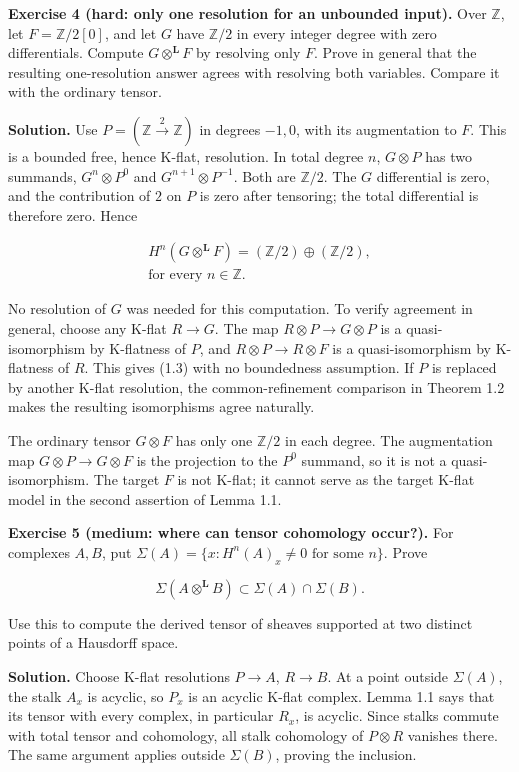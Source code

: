 \documentclass[
  english,
  11pt,
  a4paper,
]{article}
\begin{document}
\textbf{Exercise 4 (hard: only one resolution for an unbounded input).}
Over \(\mathbb Z\), let \(F=\mathbb Z/2[0]\), and let \(G\) have
\(\mathbb Z/2\) in every integer degree with zero differentials. Compute
\(G\otimes^{\mathbf L}F\) by resolving only \(F\). Prove in general that
the resulting one-resolution answer agrees with resolving both
variables. Compare it with the ordinary tensor.

\textbf{Solution.} Use \(P=(\mathbb Z\xrightarrow{2}\mathbb Z)\) in
degrees \(-1,0\), with its augmentation to \(F\). This is a bounded
free, hence K-flat, resolution. In total degree \(n\), \(G\otimes P\)
has two summands, \(G^n\otimes P^0\) and \(G^{n+1}\otimes P^{-1}\). Both
are \(\mathbb Z/2\). The \(G\) differential is zero, and the
contribution of \(2\) on \(P\) is zero after tensoring; the total
differential is therefore zero. Hence

\[\begin{gathered}
H^n(G\otimes^{\mathbf L}F)
=(\mathbb Z/2)\oplus(\mathbb Z/2),\\
\text{for every }n\in\mathbb Z.
\end{gathered}\]

No resolution of \(G\) was needed for this computation. To verify
agreement in general, choose any K-flat \(R\to G\). The map
\(R\otimes P\to G\otimes P\) is a quasi-isomorphism by K-flatness of
\(P\), and \(R\otimes P\to R\otimes F\) is a quasi-isomorphism by
K-flatness of \(R\). This gives (1.3) with no boundedness assumption. If
\(P\) is replaced by another K-flat resolution, the common-refinement
comparison in Theorem 1.2 makes the resulting isomorphisms agree
naturally.

The ordinary tensor \(G\otimes F\) has only one \(\mathbb Z/2\) in each
degree. The augmentation map \(G\otimes P\to G\otimes F\) is the
projection to the \(P^0\) summand, so it is not a quasi-isomorphism. The
target \(F\) is not K-flat; it cannot serve as the target K-flat model
in the second assertion of Lemma 1.1.

\textbf{Exercise 5 (medium: where can tensor cohomology occur?).} For
complexes \(A,B\), put
\(\Sigma(A)=\{x:H^n(A)_x\ne0\text{ for some }n\}\). Prove

\[\Sigma(A\otimes^{\mathbf L}B)\subset\Sigma(A)\cap\Sigma(B).\]

Use this to compute the derived tensor of sheaves supported at two
distinct points of a Hausdorff space.

\textbf{Solution.} Choose K-flat resolutions \(P\to A\), \(R\to B\). At
a point outside \(\Sigma(A)\), the stalk \(A_x\) is acyclic, so \(P_x\)
is an acyclic K-flat complex. Lemma 1.1 says that its tensor with every
complex, in particular \(R_x\), is acyclic. Since stalks commute with
total tensor and cohomology, all stalk cohomology of \(P\otimes R\)
vanishes there. The same argument applies outside \(\Sigma(B)\), proving
the inclusion.
\end{document}
